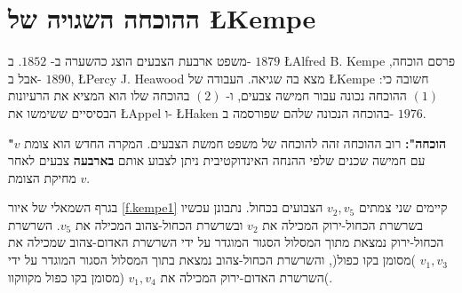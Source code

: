 



\section{ההוכחה השגויה של
\L{Kempe}}
\label{s.kempe}

משפט ארבעת הצבעים הוצג כהשערה ב-%
$1852$.
ב-%
$1879$
\L{Alfred B. Kempe}
פרסם הוכחה, אבל ב-%
$1890$,
\L{Percy J. Heawood}
מצא בה שגיאה. העבודה של
\L{Kempe}
חשובה כי: 
$(1)$
ההוכחה נכונה עבור חמישה צבעים, ו-%
$(2)$
בהוכחה שלו הוא המציא את הרעיונות הבסיסיים ששימשו את
\L{Appel}
ו-%
\L{Haken}
בהוכחה הנכונה שלהם שפורסמה ב-%
$1976$.

\textbf{"הוכחה":}
רוב ההוכחה זהה להוכחה של משפט חמשת הצבעים. המקרה החדש הוא צומת 
$v$
עם חמישה שכנים שלפי ההנחה האינדוקטיבית ניתן לצבוע אותם
\textbf{בארבעה}
צבעים לאחר מחיקת הצומת
$v$.

בגרף השמאלי של איור %
\ref{f.kempe1}
קיימים שני צמתים
$v_2,v_5$
הצבועים בכחול. נתבונן עכשיו בשרשרת הכחול-ירוק המכילה את 
$v_2$
ובשרשרת הכחול-צהוב המכילה את
$v_5$.
השרשרת הכחול-ירוק נמצאת מתוך המסלול הסגור המוגדר על ידי השרשרת האדום-צהוב שמכילה את
$v_1,v_3$
)מסומן בקו כפול(,
והשרשרת הכחול-צהוב נמצאת בתוך המסלול הסגור המוגדר על ידי השרשרת האדום-ירוק המכילה את
$v_1,v_4$
(מסומן בקו כפול מקווקוו(.

